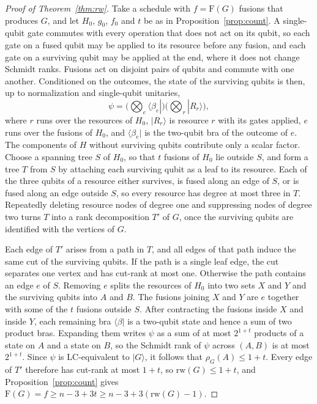 \documentclass[aps,pra,onecolumn,superscriptaddress,nofootinbib,longbibliography]{revtex4-2}
\theoremstyle{plain}
\theoremstyle{remark}
\newcommand{\F}{\mathrm{F}}
\newcommand{\LC}{\mathrm{LC}}
\newcommand{\rw}{\mathrm{rw}}
\begin{document}
\begin{proof}[Proof of Theorem~\ref{thm:rw}]
Take a schedule with $f=\F(G)$ fusions that produces $G$, and let $H_0$, $g_0$, $f_0$ and $t$ be as in
Proposition~\ref{prop:count}. A single-qubit gate commutes with every operation that does not act on its
qubit, so each gate on a fused qubit may be applied to its resource before any fusion, and each gate on a
surviving qubit may be applied at the end, where it does not change Schmidt ranks. Fusions act on disjoint
pairs of qubits and commute with one another. Conditioned on the outcomes, the state of the surviving qubits
is then, up to normalization and single-qubit unitaries,
\[
  \psi=\Big(\bigotimes_{e}\langle\beta_e|\Big)\Big(\bigotimes_{r}|R_r\rangle\Big),
\]
where $r$ runs over the resources of $H_0$, $|R_r\rangle$ is resource $r$ with its gates applied, $e$ runs
over the fusions of $H_0$, and $\langle\beta_e|$ is the two-qubit bra of the outcome of $e$. The components of
$H$ without surviving qubits contribute only a scalar factor. Choose a spanning tree $S$ of $H_0$, so that
$t$ fusions of $H_0$ lie outside $S$, and form a tree $T$ from $S$ by attaching each surviving qubit as a leaf
to its resource. Each of the three qubits of a resource either survives, is fused along an edge of $S$, or
is fused along an edge outside $S$, so every resource has degree at most three in $T$. Repeatedly deleting
resource nodes of degree one and suppressing nodes of degree two turns $T$ into a rank decomposition $T'$
of $G$, once the surviving qubits are identified with the vertices of $G$.

Each edge of $T'$ arises from a path in $T$, and all edges of that path induce the same cut of the
surviving qubits. If the path is a single leaf edge, the cut separates one vertex and has cut-rank at most
one. Otherwise the path contains an edge $e$ of $S$. Removing $e$ splits the resources of $H_0$ into two
sets $X$ and $Y$ and the surviving qubits into $A$ and $B$. The fusions joining $X$ and $Y$ are $e$
together with some of the $t$ fusions outside $S$. After contracting the fusions inside $X$ and inside $Y$,
each remaining bra $\langle\beta|$ is a two-qubit state and hence a sum of two product bras. Expanding them
writes $\psi$ as a sum of at most $2^{1+t}$ products of a state on $A$ and a state on $B$, so the Schmidt
rank of $\psi$ across $(A,B)$ is at most $2^{1+t}$. Since $\psi$ is $\LC$-equivalent to $|G\rangle$, it
follows that $\rho_G(A)\le 1+t$. Every edge of $T'$ therefore has cut-rank at most $1+t$, so
$\rw(G)\le 1+t$, and Proposition~\ref{prop:count} gives $\F(G)=f\ge n-3+3t\ge n-3+3(\rw(G)-1)$.
\end{proof}
\end{document}
